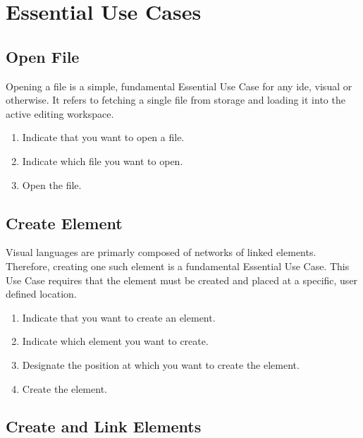 \section{Essential Use Cases}

\subsection{Open File}
\label{app:euc_open}

Opening a file is a simple, fundamental Essential Use Case for any
\ac{ide}, visual or otherwise. It refers to fetching a single file from
storage and loading it into the active editing workspace.

\begin{enumerate}
  \item Indicate that you want to open a file.
  \item Indicate which file you want to open.
  \item Open the file.
\end{enumerate}

\subsection{Create Element}
\label{app:euc_create}

Visual languages are primarly composed of networks of linked elements.
Therefore, creating one such element is a fundamental Essential Use Case.
This Use Case requires that the element must be created and placed at a
specific, user defined location.

\begin{enumerate}
  \item Indicate that you want to create an element.
  \item Indicate which element you want to create.
  \item Designate the position at which you want to create the element.
  \item Create the element.
\end{enumerate}

\subsection{Create and Link Elements}
\label{app:euc_create_link}

